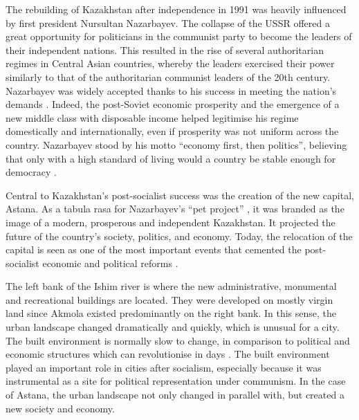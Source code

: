 \documentclass{article}
\begin{document}
The rebuilding of Kazakhstan after independence in 1991 was heavily influenced by first president Nursultan Nazarbayev. The collapse of the USSR offered a great opportunity for politicians in the communist party to become the leaders of their independent nations. This resulted in the rise of several authoritarian regimes in Central Asian countries, whereby the leaders exercised their power similarly to that of the authoritarian communist leaders of the 20th century. Nazarbayev was widely accepted thanks to his success in meeting the nation's demands \parencite{isaacs2010papa}. Indeed, the post-Soviet economic prosperity and the emergence of a new middle class with disposable income helped legitimise his regime  domestically and internationally, even if prosperity was not uniform across the country. Nazarbayev stood by his motto ``economy first, then politics'', believing that only with a high standard of living would a country be stable enough for democracy \parencite{kassymbekov_2020}.

Central to Kazakhstan's post-socialist success was the creation of the new capital, Astana. As a tabula rasa for Nazarbayev's ``pet project'' \parencite{koch2010monumental}, it was branded as the image of a modern, prosperous and independent Kazakhstan. It projected the future of the country's society, politics, and economy. Today, the relocation of the capital is seen as one of the most important events that cemented the post-socialist economic and political reforms \parencite{kassymbekov_2020}.

The left bank of the Ishim river is where the new administrative, monumental and recreational buildings are located. 
They were developed on mostly virgin land since Akmola existed predominantly on the right bank. 
In this sense, the urban landscape changed dramatically and quickly, which is unusual for a city. The built environment is normally slow to change, in comparison to political and economic structures which can revolutionise in days \parencite{stanilov2007post}. The built environment played an important role in cities after socialism, especially because it was instrumental as a site for political representation under communism. In the case of Astana, the urban landscape not only changed in parallel with, but created a new society and economy. 
\end{document}
